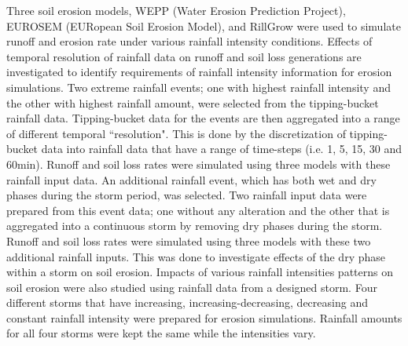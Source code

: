 Three soil erosion models, WEPP (Water Erosion Prediction Project), EUROSEM
(EURopean Soil Erosion Model), and RillGrow were used to simulate runoff and
erosion rate under various rainfall intensity conditions. Effects of temporal
resolution of rainfall data on runoff and soil loss generations are
investigated
to identify requirements of rainfall intensity information for erosion
simulations. Two extreme rainfall events; one with highest rainfall intensity
and the other with highest rainfall amount, were selected from the
tipping-bucket rainfall data. Tipping-bucket data for the events are then
aggregated into a range of different temporal ``resolution". This is done by
the
discretization of tipping-bucket data into rainfall data that have a range of
time-steps (i.e. 1, 5, 15, 30 and 60min).
Runoff and soil loss rates were simulated using three models with these
rainfall
input data. An additional rainfall event, which has both wet and dry phases
during the storm period, was selected. Two rainfall input data were prepared
from this event data; one without any alteration and the other that is
aggregated into a continuous storm by removing dry phases during the storm.
Runoff and soil loss rates were simulated using three models with these two
additional rainfall inputs. This was done to investigate effects of the dry
phase within a storm on soil erosion. Impacts of various rainfall intensities
patterns on soil erosion were also studied using rainfall data from a designed
storm. Four different storms that have increasing, increasing-decreasing,
decreasing and constant rainfall intensity were prepared for erosion
simulations. Rainfall amounts for all four storms were kept the same while the
intensities vary.

